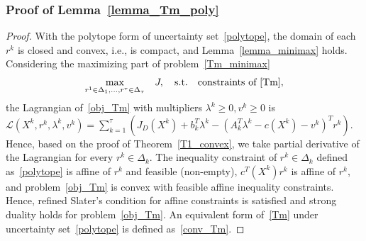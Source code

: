 \documentclass[10pt,twocolumn,twoside,english]{IEEEtran}
\begin{document}
\subsubsection{Proof of Lemma~\ref{lemma_Tm_poly}}
\label{appendix_Tm_poly1}
\begin{proof}
With the polytope form of uncertainty set~\eqref{polytope}, the domain of each $r^k$ is closed and convex, i.e., is compact, and Lemma~\ref{lemma_minimax} holds. Considering the maximizing part of problem~\eqref{Tm_minimax}
\begin{align}
\underset{r^1\in \Delta_1, \dots, r^{\tau}\in\Delta_{\tau}}{\text{max}}\quad  J, \quad
\text{s.t.}    \quad \text{constraints of~\eqref{Tm}},
\label{obj_Tm}
\end{align}
the Lagrangian of~\eqref{obj_Tm} with multipliers $\lambda^k \geqslant 0, v^k \geqslant 0$ is $\mathcal{L}(X^k,r^k,\lambda^k,v^k)=\sum_{k=1}^{\tau}(J_D(X^k)+b_k^T\lambda^k-(A_k^T\lambda^k-c(X^k)-v^k)^T r^k)$.
Hence, based on the proof of Theorem~\ref{T1_convex}, we take partial derivative of the Lagrangian for every $r^k\in \Delta_k$. The inequality constraint of $r^k\in\Delta_k$ defined as~\eqref{polytope} is affine of $r^k$ and feasible (non-empty), $c^T(X^k)r^k$ is affine of $r^k$, and problem~\eqref{obj_Tm} is convex with feasible affine inequality constraints. Hence, refined Slater's condition for affine constraints is satisfied and strong duality holds for problem~\eqref{obj_Tm}. An equivalent form of~\eqref{Tm} under uncertainty set~\eqref{polytope} is defined as~\eqref{conv_Tm}.
\end{proof}
\end{document}
